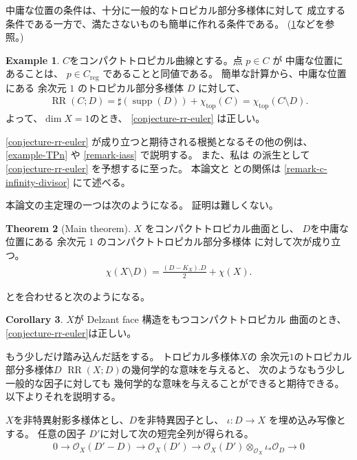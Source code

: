 \documentclass[a4paper,dvipdfmx,reqno,12pt]{amsart}
\theoremstyle{definition}
\newtheorem{theorem}{Theorem}[section]
\newtheorem{example}[theorem]{Example}
\newtheorem{corollary}[theorem]{Corollary}
\newcommand{\opn}[1]{\operatorname{#1}}
\numberwithin{equation}{section}
\begin{document}
中庸な位置の条件は、十分に一般的なトロピカル部分多様体に対して
成立する条件である一方で、満たさないものも簡単に作れる条件である。
(\cref{example-permissible-point}などを参照。)

\begin{example}
\label{example-permissible-point}
$C$をコンパクトトロピカル曲線とする。点 $p\in C$ が
中庸な位置にあることは、
$p\in C_{\opn{reg}}$ であることと同値である。
簡単な計算から、中庸な位置にある
余次元 $1$ のトロピカル部分多様体
$D$ に対して、
\begin{align}
\opn{RR}(C;D)=\sharp (\opn{supp}(D))+ \chi_{\opn{top}}(C)
=\chi_{\opn{top}}(C\setminus D).
\end{align}
よって、$\dim X=1$のとき、
\cref{conjecture-rr-euler}
は正しい。
\end{example}

\cref{conjecture-rr-euler}
が成り立つと期待される根拠となるその他の例は、
\cref{example-TPn} や
\cref{remark-iass} で説明する。
また、私は \cite{tsutsui2023graded} 
の派生として \cref{conjecture-rr-euler}
を予想するに至った。
本論文と \cite{tsutsui2023graded}
との関係は \cref{remark-c-infinity-divisor}
にて述べる。

本論文の主定理の一つは次のようになる。
証明は難しくない。
\begin{theorem}[{Main theorem}]
\label{theorem-rr-euler-surface}
$X$ をコンパクトトロピカル曲面とし、
$D$を中庸な位置にある
余次元 $1$ のコンパクトトロピカル部分多様体
に対して次が成り立つ。
\begin{align}
\chi(X\setminus D)=\frac{(D-K_X). D}{2}+
\chi(X).
\end{align}
\end{theorem}
\cite[Theorem 6.3]{demedrano2023chern}
とを合わせると次のようになる。
\begin{corollary}
$X$が Delzant face 構造をもつコンパクトトロピカル
曲面のとき、 \cref{conjecture-rr-euler}は正しい。
\end{corollary}

もう少しだけ踏み込んだ話をする。
トロピカル多様体$X$の
余次元$1$のトロピカル部分多様体$D$
$\opn{RR}(X;D)$の幾何学的な意味を与えると、
次のようなもう少し一般的な因子に対しても
幾何学的な意味を与えることができると期待できる。
以下よりそれを説明する。

$X$を非特異射影多様体とし、$D$を非特異因子とし、
$\iota\colon D\to X$ を埋め込み写像とする。
任意の因子 $D'$に対して次の短完全列が得られる。
\begin{align}
0 \to \mathcal{O}_X(D'-D)\to \mathcal{O}_X(D')
\to \mathcal{O}_X(D')
\otimes_{\mathcal{O}_X} \iota_*\mathcal{O}_D \to 0 
\end{align}
\end{document}
